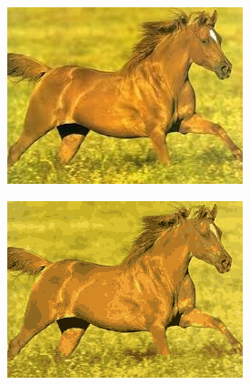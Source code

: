 \begin{figure}[htbp]
    \centering
    \caption{
        Case study: \texttt{horse-170.jpg}, $k=15$.
        Original image, reconstructed image using k-means, reconstruction error,
        and clusterings in sample space.
    }
    \begin{subfigure}[t]{0.32\textwidth}
        \includegraphics[width=\linewidth]{../../rust_code/data/kmeans/horse-170.jpg}
    \end{subfigure}
    \begin{subfigure}[t]{0.32\textwidth}
        \includegraphics[width=\linewidth]{../../python_code/plots/kmeans/horse-170/reconstruction.png}
    \end{subfigure}

\end{figure}
